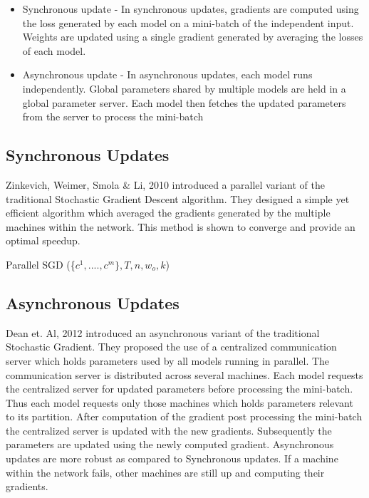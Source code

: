 \documentclass[sigconf]{acmart}
\begin{document}
\begin{itemize}
\setlength\itemsep{1em}
\item Synchronous update - In synchronous updates, gradients are computed using the loss generated by each model on a mini-batch of the independent input. Weights are updated using a single gradient generated by averaging the losses of each model.

\item Asynchronous update - In asynchronous updates, each model runs independently. Global parameters shared by multiple models are held in a global parameter server. Each model then fetches the updated parameters from the server to process the mini-batch
\end{itemize}


\subsection{Synchronous Updates}

Zinkevich, Weimer,  Smola \& Li, 2010 \cite{NIPS2010_4006} introduced a parallel variant of the traditional Stochastic Gradient Descent algorithm.  They designed a simple yet efficient algorithm which averaged the gradients generated by the multiple machines within the network. This method is shown to converge and provide an optimal speedup.

\begin{algorithm}

\caption{Parallel SGD (\{$ c^1,....,c^m\} , T, n, w_o,k$)}\label{SGD}

\begin{algorithmic}[1]

\EndFor
{}
\end{algorithmic}

\end{algorithm}


\subsection{Asynchronous Updates}

Dean et. Al, 2012 \cite{Dean} introduced an asynchronous variant of the traditional Stochastic Gradient. They proposed the use of a centralized communication server which holds parameters used by all models running in parallel. The communication server is distributed across several machines. Each model requests the centralized server for updated parameters before processing the mini-batch. Thus each model requests only those machines which holds parameters relevant to its partition. After computation of the gradient post processing the mini-batch the centralized server is updated with the new gradients. Subsequently the parameters are updated using the newly computed gradient. Asynchronous updates are more robust as compared to Synchronous updates. If a machine within the network fails, other machines are still up and computing their gradients.  
\end{document}
